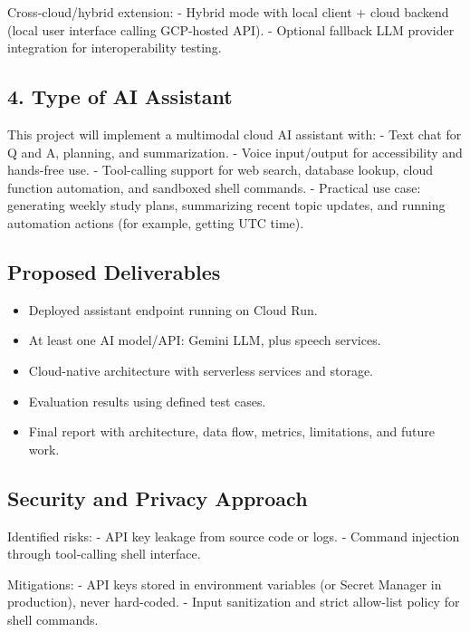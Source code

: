 \documentclass[
]{article}
\providecommand{\tightlist}{%
  \setlength{\itemsep}{0pt}\setlength{\parskip}{0pt}}
\begin{document}
Cross-cloud/hybrid extension: - Hybrid mode with local client + cloud
backend (local user interface calling GCP-hosted API). - Optional
fallback LLM provider integration for interoperability testing.

\subsection{4. Type of AI Assistant}\label{type-of-ai-assistant}

This project will implement a multimodal cloud AI assistant with: - Text
chat for Q and A, planning, and summarization. - Voice input/output for
accessibility and hands-free use. - Tool-calling support for web search,
database lookup, cloud function automation, and sandboxed shell
commands. - Practical use case: generating weekly study plans,
summarizing recent topic updates, and running automation actions (for
example, getting UTC time).

\subsection{Proposed Deliverables}\label{proposed-deliverables}

\begin{itemize}
\tightlist
\item
  Deployed assistant endpoint running on Cloud Run.
\item
  At least one AI model/API: Gemini LLM, plus speech services.
\item
  Cloud-native architecture with serverless services and storage.
\item
  Evaluation results using defined test cases.
\item
  Final report with architecture, data flow, metrics, limitations, and
  future work.
\end{itemize}

\subsection{Security and Privacy
Approach}\label{security-and-privacy-approach}

Identified risks: - API key leakage from source code or logs. - Command
injection through tool-calling shell interface.

Mitigations: - API keys stored in environment variables (or Secret
Manager in production), never hard-coded. - Input sanitization and
strict allow-list policy for shell commands.
\end{document}
